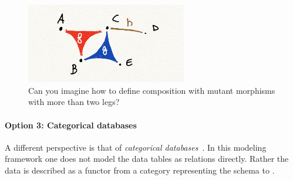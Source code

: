\begin{figure}[h]
    \centering
    \includegraphics[width=7cm]{mutants}
    \caption{Can you imagine how to define
    composition with mutant morphisms
    with more than two legs?}
\end{figure}

\paragraph{Option 3: Categorical databases}

A different perspective is that of \emph{categorical databases}~\cite{spivak2019categorical}. In this modeling framework
one does not model the data tables as relations directly.
Rather the data is described as a functor
from a category representing the schema
to \Set.

